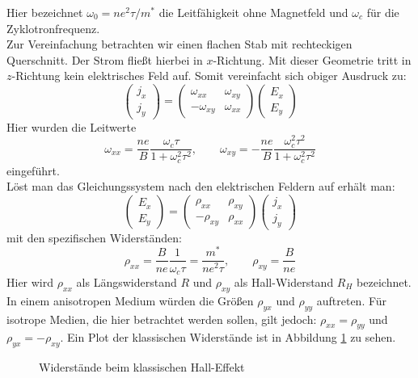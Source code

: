 Hier bezeichnet $\omega_0 = n e^2 \tau / m^*$ die Leitfähigkeit ohne Magnetfeld
und $\omega_c$ für die Zyklotronfrequenz.\\
Zur Vereinfachung betrachten wir einen flachen Stab mit rechteckigen Querschnitt.
Der Strom fließt hierbei in $x$-Richtung. Mit dieser Geometrie tritt in
$z$-Richtung kein elektrisches Feld auf. Somit vereinfacht sich obiger Ausdruck zu:
\[
    \begin{pmatrix}
        j_x \\ j_y
    \end{pmatrix}
    = \begin{pmatrix}
         \omega_{xx} & \omega_{xy} \\
        -\omega_{xy} & \omega_{xx}
      \end{pmatrix}
      \begin{pmatrix}
          E_x \\ E_y
      \end{pmatrix}
\]
Hier wurden die Leitwerte
\[
    \omega_{xx} = \frac{ne}{B} \frac{\omega_c \tau}{1+\omega_c^2 \tau^2}, \qquad
    \omega_{xy} = -\frac{ne}{B} \frac{\omega_c^2 \tau^2}{1+\omega_c^2 \tau^2}
\]
eingeführt.\\
Löst man das Gleichungssystem nach den elektrischen Feldern auf erhält man:
\[
    \begin{pmatrix} E_x \\ E_y \end{pmatrix}
    = \begin{pmatrix}
         \rho_{xx} & \rho_{xy} \\
        -\rho_{xy} & \rho_{xx} 
      \end{pmatrix}
      \begin{pmatrix}
          j_x \\ j_y
      \end{pmatrix}
\]
mit den spezifischen Widerständen:
\[
    \rho_{xx} = \frac{B}{ne} \frac{1}{\omega_c \tau} = \frac{m^*}{ne^2\tau}, \qquad
    \rho_{xy} = \frac{B}{ne}
\]
Hier wird $\rho_{xx}$ als Längswiderstand $R$ und $\rho_{xy}$ als Hall-Widerstand
$R_H$ bezeichnet.
In einem anisotropen Medium würden die Größen $\rho_{yx}$ und $\rho_{yy}$
auftreten. Für isotrope Medien, die hier betrachtet werden sollen, gilt jedoch:
$\rho_{xx} = \rho_{yy}$ und $\rho_{yx} = - \rho_{xy}$. Ein Plot der klassischen
Widerstände ist in Abbildung \ref{Abb:klassisch} zu sehen. \cite{hunklinger}
\begin{figure}
    \centering
    
    \caption{Widerstände beim klassischen Hall-Effekt}
    \label{Abb:klassisch}
\end{figure}

